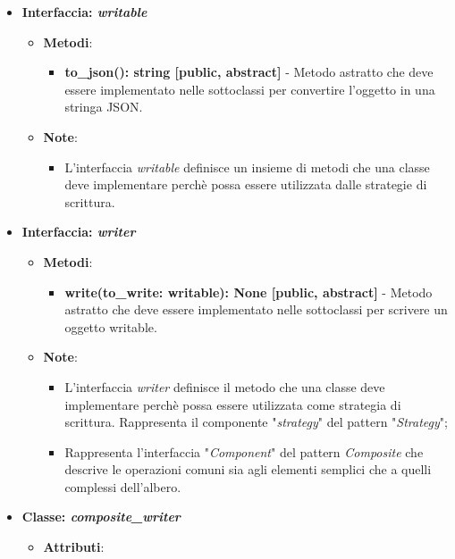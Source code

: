\begin{itemize}
    \item{\textbf{Interfaccia: \textit{writable}}}
    \begin{itemize}
        \item\textbf{Metodi}: 
        \begin{itemize}
            \item \textbf{to\_json(): string [public, abstract]} - Metodo astratto che deve essere implementato nelle sottoclassi per convertire l'oggetto in una stringa JSON.
        \end{itemize}
        \item\textbf{Note}:
        \begin{itemize}
            \item L'interfaccia \textit{writable} definisce un insieme di metodi che una classe deve implementare perchè possa essere utilizzata dalle strategie di scrittura.
        \end{itemize}
    \end{itemize}
    \item{\textbf{Interfaccia: \textit{writer}}}
     \begin{itemize}
        \item \textbf{Metodi}:
         \begin{itemize}
            \item \textbf{write(to\_write: writable): None [public, abstract]} - Metodo astratto che deve essere implementato nelle sottoclassi per scrivere un oggetto writable.
        \end{itemize}
        \item\textbf{Note}:
        \begin{itemize}
            \item L'interfaccia \textit{writer} definisce il metodo che una classe deve implementare perchè possa essere utilizzata come strategia di scrittura. Rappresenta il componente "\textit{strategy}" del pattern "\textit{Strategy}";
            \item Rappresenta l'interfaccia "\textit{Component}" del pattern \textit{Composite} che descrive le operazioni comuni sia agli elementi semplici che a quelli complessi dell'albero.
        \end{itemize}
    \end{itemize}
    \item{\textbf{Classe: \textit{composite\_writer}}}
    \begin{itemize}
    \item\textbf{Attributi}:

\end{itemize}
\end{itemize}
